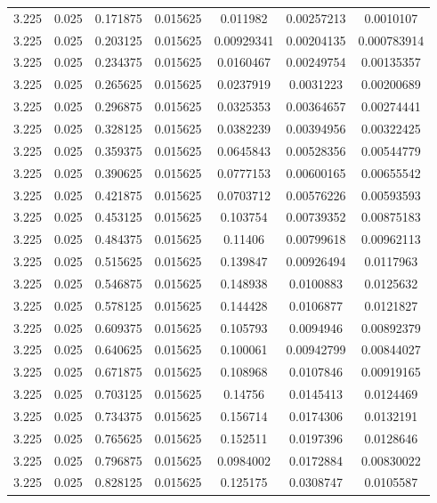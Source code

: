\begin{table}[bh]
\begin{center}
{\begin{tabular}{ccccccc}
3.225	 & 0.025 & 	0.171875	 & 0.015625	 & 0.011982	 & 0.00257213	 & 0.0010107 \\ 
3.225	 & 0.025 & 	0.203125	 & 0.015625	 & 0.00929341	 & 0.00204135	 & 0.000783914 \\ 
3.225	 & 0.025 & 	0.234375	 & 0.015625	 & 0.0160467	 & 0.00249754	 & 0.00135357 \\ 
3.225	 & 0.025 & 	0.265625	 & 0.015625	 & 0.0237919	 & 0.0031223	 & 0.00200689 \\ 
3.225	 & 0.025 & 	0.296875	 & 0.015625	 & 0.0325353	 & 0.00364657	 & 0.00274441 \\ 
3.225	 & 0.025 & 	0.328125	 & 0.015625	 & 0.0382239	 & 0.00394956	 & 0.00322425 \\ 
3.225	 & 0.025 & 	0.359375	 & 0.015625	 & 0.0645843	 & 0.00528356	 & 0.00544779 \\ 
3.225	 & 0.025 & 	0.390625	 & 0.015625	 & 0.0777153	 & 0.00600165	 & 0.00655542 \\ 
3.225	 & 0.025 & 	0.421875	 & 0.015625	 & 0.0703712	 & 0.00576226	 & 0.00593593 \\ 
3.225	 & 0.025 & 	0.453125	 & 0.015625	 & 0.103754	 & 0.00739352	 & 0.00875183 \\ 
3.225	 & 0.025 & 	0.484375	 & 0.015625	 & 0.11406	 & 0.00799618	 & 0.00962113 \\ 
3.225	 & 0.025 & 	0.515625	 & 0.015625	 & 0.139847	 & 0.00926494	 & 0.0117963 \\ 
3.225	 & 0.025 & 	0.546875	 & 0.015625	 & 0.148938	 & 0.0100883	 & 0.0125632 \\ 
3.225	 & 0.025 & 	0.578125	 & 0.015625	 & 0.144428	 & 0.0106877	 & 0.0121827 \\ 
3.225	 & 0.025 & 	0.609375	 & 0.015625	 & 0.105793	 & 0.0094946	 & 0.00892379 \\ 
3.225	 & 0.025 & 	0.640625	 & 0.015625	 & 0.100061	 & 0.00942799	 & 0.00844027 \\ 
3.225	 & 0.025 & 	0.671875	 & 0.015625	 & 0.108968	 & 0.0107846	 & 0.00919165 \\ 
3.225	 & 0.025 & 	0.703125	 & 0.015625	 & 0.14756	 & 0.0145413	 & 0.0124469 \\ 
3.225	 & 0.025 & 	0.734375	 & 0.015625	 & 0.156714	 & 0.0174306	 & 0.0132191 \\ 
3.225	 & 0.025 & 	0.765625	 & 0.015625	 & 0.152511	 & 0.0197396	 & 0.0128646 \\ 
3.225	 & 0.025 & 	0.796875	 & 0.015625	 & 0.0984002	 & 0.0172884	 & 0.00830022 \\ 
3.225	 & 0.025 & 	0.828125	 & 0.015625	 & 0.125175	 & 0.0308747	 & 0.0105587 \\ 

\end{tabular}}
\end{center}
\end{table}
